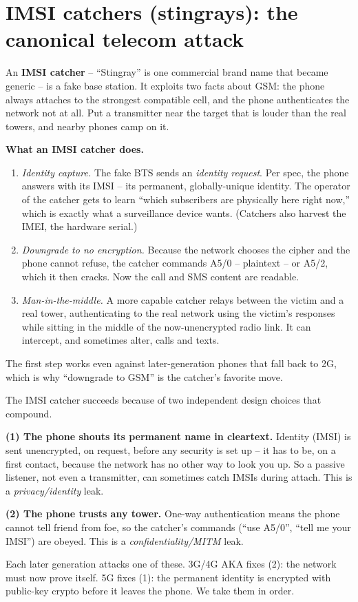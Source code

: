 \section{IMSI catchers (stingrays): the canonical telecom attack}
\label{ch29:imsi-catchers}

An \textbf{IMSI catcher} -- ``Stingray'' is one commercial brand name that became generic -- is a fake base station. It exploits two facts about GSM: the phone always attaches to the strongest compatible cell, and the phone authenticates the network not at all. Put a transmitter near the target that is louder than the real towers, and nearby phones camp on it.

\begin{attackbox}
\textbf{What an IMSI catcher does.}
\begin{enumerate}
  \item \emph{Identity capture.} The fake BTS sends an \emph{identity request}. Per spec, the phone answers with its IMSI -- its permanent, globally-unique identity. The operator of the catcher gets to learn ``which subscribers are physically here right now,'' which is exactly what a surveillance device wants. (Catchers also harvest the IMEI, the hardware serial.)
  \item \emph{Downgrade to no encryption.} Because the network chooses the cipher and the phone cannot refuse, the catcher commands A5/0 -- plaintext -- or A5/2, which it then cracks. Now the call and SMS content are readable.
  \item \emph{Man-in-the-middle.} A more capable catcher relays between the victim and a real tower, authenticating to the real network using the victim's responses while sitting in the middle of the now-unencrypted radio link. It can intercept, and sometimes alter, calls and texts.
\end{enumerate}
The first step works even against later-generation phones that fall back to 2G, which is why ``downgrade to GSM'' is the catcher's favorite move.
\end{attackbox}

\begin{intuitionbox}
The IMSI catcher succeeds because of two independent design choices that compound.

\textbf{(1) The phone shouts its permanent name in cleartext.} Identity (IMSI) is sent unencrypted, on request, before any security is set up -- it has to be, on a first contact, because the network has no other way to look you up. So a passive listener, not even a transmitter, can sometimes catch IMSIs during attach. This is a \emph{privacy/identity} leak.

\textbf{(2) The phone trusts any tower.} One-way authentication means the phone cannot tell friend from foe, so the catcher's commands (``use A5/0'', ``tell me your IMSI'') are obeyed. This is a \emph{confidentiality/MITM} leak.

Each later generation attacks one of these. 3G/4G AKA fixes (2): the network must now prove itself. 5G fixes (1): the permanent identity is encrypted with public-key crypto before it leaves the phone. We take them in order.
\end{intuitionbox}

